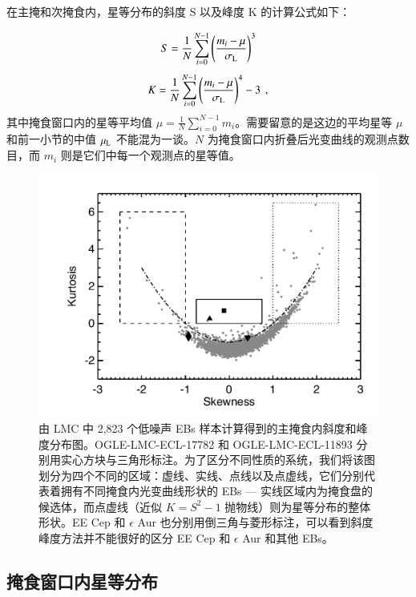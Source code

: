 在主掩和次掩食内，星等分布的斜度 S 以及峰度 K 的计算公式如下：

\begin{equation} \label{eq:skew}
S =  \frac{1}{N} \sum_{i=0}^{N-1} \left(\frac{m_i - \mu}{\sigma_\mathrm{L}}\right)^3 
\end{equation} %
\begin{equation} \label{eq:kur}
K =  \frac{1}{N} \sum_{i=0}^{N-1} \left(\frac{m_i - \mu}{\sigma_\mathrm{L}}\right)^4 - 3 \, \ , 
\end{equation} %
其中掩食窗口内的星等平均值 $\mu = \frac{1}{N} \sum_{i=0}^{N-1} m_i$。需要留意的是这边的平均星等 
$\mu$ 和前一小节的中值 $\mu_\mathrm{L}$ 不能混为一谈。$N$ 为掩食窗口内折叠后光变曲线的观测点数
目，而 $m_i$ 则是它们中每一个观测点的星等值。


\begin{figure}[t]
\centering
\includegraphics[width=1.0\textwidth,trim={0.4in 0.2in 0 0}]{figures/chapter3/f5_lmcks.pdf}
\caption{由 LMC 中 2,823 个低噪声 EBs 样本计算得到的主掩食内斜度和峰度分布图。OGLE-LMC-ECL-17782 和 OGLE-LMC-ECL-11893 分别用实心方块与三角形标注。为了区分不同性质的系统，我们将该图划分为四个不同的区域：虚线、实线、点线以及点虚线，它们分别代表着拥有不同掩食内光变曲线形状的 EBs --- 实线区域内为掩食盘的候选体，而点虚线（近似 $K=S^2-1$ 抛物线）则为星等分布的整体形状。EE Cep 和 $\epsilon$ Aur 也分别用倒三角与菱形标注，可以看到斜度峰度方法并不能很好的区分 EE Cep 和 $\epsilon$ Aur 和其他 EBs。}
\label{fig:lmcks}
\end{figure}


\subsection{掩食窗口内星等分布} \label{sec:discebresult}


